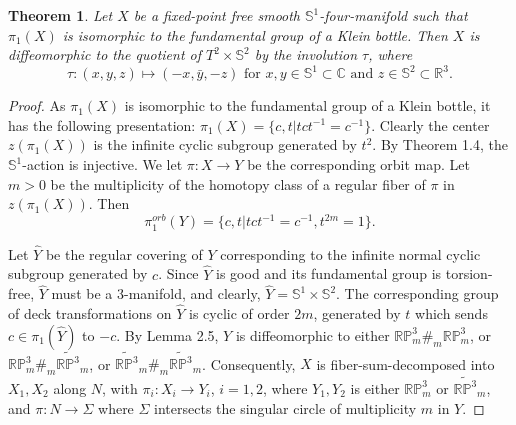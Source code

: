 \documentclass[11pt]{amsart}
\theoremstyle{plain}
\newtheorem{theorem}{Theorem}
\numberwithin{theorem}{section}
\theoremstyle{definition}
\begin{document}
\begin{theorem}
Let $X$ be a fixed-point free smooth ${{\mathbb S}}^1$-four-manifold such that $\pi_1(X)$ is isomorphic 
to the fundamental group of a Klein bottle. Then $X$ is diffeomorphic to the quotient of 
$T^2\times{{\mathbb S}}^2$ by the involution $\tau$, where 
$$
\tau: (x,y,z)\mapsto (-x,\bar{y},-z) \mbox{ for } x,y \in {{\mathbb S}}^1\subset{{\mathbb C}} \mbox{ and } z\in{{\mathbb S}}^2\subset {{\mathbb R}}^3.
$$
\end{theorem}

\begin{proof}

As $\pi_1(X)$ is isomorphic to the fundamental group of a Klein bottle, it has the following
presentation: $\pi_1(X)=\{c,t| tct^{-1}=c^{-1}\}$. Clearly the center $z(\pi_1(X))$ is the infinite
cyclic subgroup generated by $t^2$. By Theorem 1.4, the ${{\mathbb S}}^1$-action is injective. We let
$\pi:X\rightarrow Y$ be the corresponding orbit map. Let $m>0$ be the multiplicity of the 
homotopy class of a regular fiber of $\pi$ in $z(\pi_1(X))$. Then 
$$\pi_1^{orb}(Y)=\{c,t|tct^{-1}=c^{-1}, t^{2m}=1\}.$$ 

Let $\hat{Y}$ be the regular covering of $Y$ corresponding to the infinite normal cyclic subgroup
generated by $c$. Since $\hat{Y}$ is good and its fundamental group is torsion-free,
$\hat{Y}$ must be a $3$-manifold, and clearly, $\hat{Y}={{\mathbb S}}^1\times {{\mathbb S}}^2$. The corresponding
group of deck transformations on $\hat{Y}$ is cyclic of order $2m$, generated by $t$ which 
sends $c\in \pi_1(\hat{Y})$ to $-c$. By Lemma 2.5, $Y$ is diffeomorphic to either 
${{\mathbb R}}{{\mathbb P}}^3_m \#_{m} {{\mathbb R}}{{\mathbb P}}^3_m$, or ${{\mathbb R}}{{\mathbb P}}^3_m \#_{m} \widetilde{{{\mathbb R}}{{\mathbb P}}^3}_m$, 
or $\widetilde{{{\mathbb R}}{{\mathbb P}}^3}_m\#_{m} \widetilde{{{\mathbb R}}{{\mathbb P}}^3}_m$. Consequently, $X$ is fiber-sum-decomposed 
into $X_1,X_2$ along $N$, with $\pi_i:X_i\rightarrow Y_i$, $i=1,2$, where $Y_1,Y_2$ is either 
${{\mathbb R}}{{\mathbb P}}^3_m$ or $\widetilde{{{\mathbb R}}{{\mathbb P}}^3}_m$, and $\pi: N\rightarrow \Sigma$ where $\Sigma$ intersects
the singular circle of multiplicity $m$ in $Y$. 


\end{proof}
\end{document}
